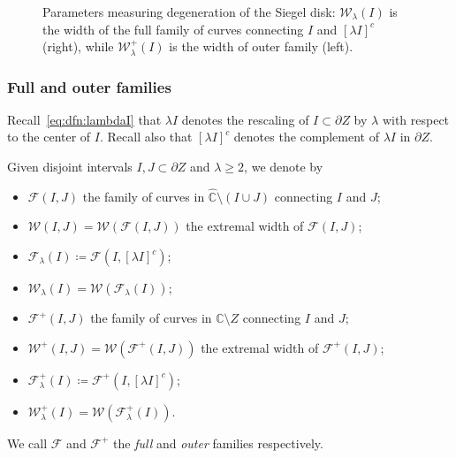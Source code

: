 \documentclass{amsart}
\newcommand{\1}{{\mathbb 1 }}
\newcommand{\Fam}{{\mathcal F}}
\newcommand{\Width}{{\mathcal W}}
\newcommand{\wC}{\widehat{\mathbb{C}}}
\newcommand{\C}{\mathbb{C}}
\theoremstyle{remark}
\numberwithin{equation}{section}
\theoremstyle{definition}
\begin{document}
\begin{figure}


\caption{Parameters measuring degeneration of the Siegel disk: $\Width_\lambda(I)$ is the width of the full family of curves connecting $I$ and $[\lambda I]^c$ (right), while $\Width^+_\lambda(I)$ is the width of outer family (left).}
\label{fig:Width Width^+}
\end{figure}





\subsubsection{Full and outer families} \label{ss:FullOutFam} Recall~\eqref{eq:dfn:lambdaI} that $\lambda I$ denotes the rescaling of $I\subset \partial Z$ by $\lambda$ with respect to the center of $I$. Recall also that $[\lambda I]^c$ denotes the complement of $\lambda I$ in $\partial Z$. 

Given disjoint intervals $I,J\subset \partial Z$ and $\lambda\ge 2$, we denote by
\begin{itemize}
\item $\Fam(I,J)$ the family of curves in $\wC\setminus (I\cup J)$ connecting $I$ and $J$;
\item $\Width (I,J)=\Width (\Fam(I,J))$ the extremal width of $\Fam(I,J)$; 
\item $\Fam_\lambda(I)\coloneqq \Fam\left(I, [\lambda I]^c \right)$;
\item $\Width_\lambda(I) =\Width(\Fam_\lambda (I))$;
\item $\Fam^+(I,J)$ the family of curves in $\C\setminus Z$ connecting $I$ and $J$;
\item $\Width^+(I,J)=\Width (\Fam^+(I,J))$ the extremal width of $\Fam^+(I,J)$; 
\item $\Fam^+_\lambda(I)\coloneqq \Fam^+\left(I, [\lambda I]^c \right)$;
\item $\Width^+_\lambda(I) =\Width(\Fam^+_\lambda (I))$.
\end{itemize}
We call $\Fam$ and $\Fam^+$ the \emph{full} and \emph{outer} families respectively.
\end{document}
